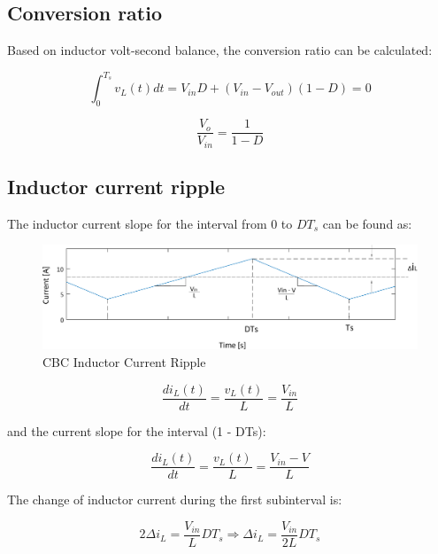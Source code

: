 \subsection{Conversion ratio}\label{sec:conversionRatio}

Based on inductor volt-second balance, the conversion ratio can be calculated:

\begin{equation}
	\int_{0}^{T_s} v_L(t)dt = V_{in}D + (V_{in}-V_{out})(1-D) = 0
	\label{eq:CBC_VISB}
\end{equation}

\begin{equation}
	\frac{V_o}{V_{in}} = \frac{1}{1-D}
	\label{eq:CBC_CR}
\end{equation}

\subsection{Inductor current ripple}\label{sec:CBC_ICR}

The inductor current slope for the interval from 0 to $DT_s$ can be found as:

\begin{figure}[H]
   \centering
   \includegraphics[width=\textwidth]{figures/aConventionalBoost/InductorCurrent.pdf}
    \caption{CBC Inductor Current Ripple}
	\label{fig:CBC_InductorCurrent}
\end{figure}


\begin{equation}
	\frac{di_L(t)}{dt} = \frac{v_L(t)}{L} = \frac{V_{in}}{L}
	\label{eq:CBC_ICR1}
\end{equation}

and the current slope for the interval (1 - DTs):

\begin{equation}
	\frac{di_L(t)}{dt} = \frac{v_L(t)}{L} = \frac{V_{in} - V}{L}
	\label{eq:CBC_ICR2}
\end{equation}

The change of inductor current during the first subinterval is:

\begin{equation}
	2\Delta i_L = \frac{V_{in}}{L}DT_s \Rightarrow
  \Delta i_L = \frac{V_{in}}{2L}DT_s
	\label{eq:CBC_ICR3}
\end{equation}

